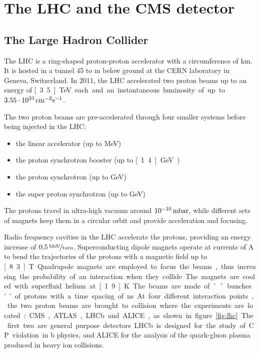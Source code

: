 \chapter{The LHC and the CMS detector}
\section{The Large Hadron Collider}
The LHC is a ring-shaped proton-proton accelerator with a circumference of
\unit[27]{km}. It is hosted in a tunnel 45 to \unit[170]{m} below ground at
the CERN laboratory in Geneva, Switzerland. In 2011, the LHC accelerated two
proton beams up to an energy of \unit[3.5]{TeV} each and an instantaneous
luminosity of up to $\unit[3.55\cdot 10^{33}]{cm^{-2}s^{-1}}$.

The two proton beams are pre-accelerated through four smaller systems before
being injected in the LHC:
\begin{itemize}
    \item the linear accelerator (up to \unit[50]{MeV})
    \item the proton synchrotron booster (up to \unit[1.4]{GeV})
    \item the proton synchrotron (up to \unit[26]{GeV})
    \item the super proton synchrotron (up to \unit[450]{GeV})
\end{itemize}

The protons travel in ultra-high vacuum around
$\unit[10^{-10}]{mbar}$, while different sets of magnets keep them in a
circular orbit and provide acceleration and focusing.

Radio frequency cavities in the LHC accelerate the protons, providing an energy
increase of $\unitfrac[0.5]{MeV}{turn}$.
Superconducting dipole magnets operate at currents of \unit[11850]{A} to bend the trajectories
of the protons with a magnetic field up to \unit[8.3]{T}.
Quadrupole magnets are employed to focus the beams, thus increasing the
probability of an interaction when they collide.
The magnets are cooled with superfluid helium at \unit[1.9]{K}.
The beams are made of ``bunches'' of protons with a time spacing of
\unit[50]{ns}.

At four different interaction points, the two proton beams are brought to
collision where the experiments are located: CMS, ATLAS, LHCb and ALICE, as
shown in figure~\ref{fig:lhc}.
The first two are general purpose detectors. LHCb is designed for the study
of CP violation in $\mathrm{b}$ physics, and ALICE for the analysis of the
quark-gluon plasma produced in heavy ion collisions.

